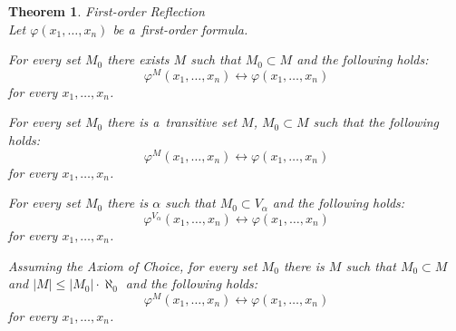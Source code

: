 \documentclass[12pt,a4paper]{article}
\newtheorem{theorem}{Theorem}[section]
\renewcommand{\iff}{\leftrightarrow}
\newcommand{\bce}{\begin{compactenum}}
\newcommand{\ece}{\end{compactenum}}
\begin{document}
\begin{theorem}{First-order Reflection}\label{theorem:first_order_reflection}\\
Let $\varphi(x_1, \ldots, x_n)$ be a~first-order formula.
\bce[(i)]
\item For every set $M_0$ there exists $M$ such that $M_0 \subset M$ and the following holds:
\begin{equation}
\varphi^M(x_1, \ldots, x_n) \iff \varphi(x_1, \ldots, x_n)
\end{equation}
for every $x_1, \ldots, x_n$.

\item For every set $M_0$  there is a~transitive set $M$, $M_0 \subset M$ such that the following holds:
\begin{equation}
\varphi^M(x_1, \ldots, x_n) \iff \varphi(x_1, \ldots, x_n)
\end{equation}
for every $x_1, \ldots, x_n$.

\item For every set $M_0$ there is $\alpha$ such that $M_0 \subset V_{\alpha}$ and the following holds:
\begin{equation}
\varphi^{V_{\alpha}}(x_1, \ldots, x_n) \iff \varphi(x_1, \ldots, x_n)
\end{equation}
for every $x_1, \ldots, x_n$.

\item Assuming the Axiom of Choice, for every set $M_0$ there is $M$ such that $M_0 \subset M$ and $|M| \leq |M_0| \cdot \aleph_0$ and the following holds:
\begin{equation}
\varphi^M(x_1, \ldots, x_n) \iff \varphi(x_1, \ldots, x_n)
\end{equation}
for every $x_1, \ldots, x_n$.
\ece
\end{theorem}
\end{document}
